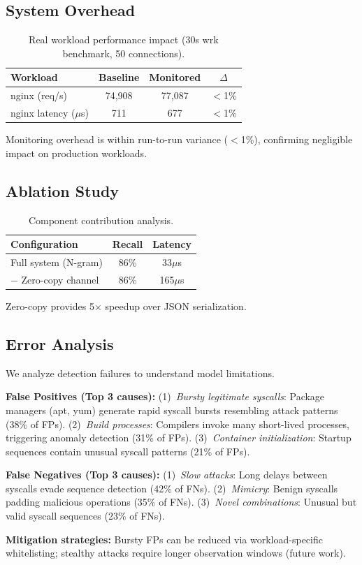 \subsection{System Overhead}

\begin{table}[t]
\centering
\caption{Real workload performance impact (30s wrk benchmark, 50 connections).}
\label{tab:overhead}
\begin{tabular}{lccc}
\toprule
\textbf{Workload} & \textbf{Baseline} & \textbf{Monitored} & \textbf{$\Delta$} \\
\midrule
nginx (req/s) & 74,908 & 77,087 & $<$1\% \\
nginx latency ($\mu$s) & 711 & 677 & $<$1\% \\
\bottomrule
\end{tabular}
\end{table}

Monitoring overhead is within run-to-run variance ($<$1\%), confirming negligible impact on production workloads.

\subsection{Ablation Study}

\begin{table}[t]
\centering
\caption{Component contribution analysis.}
\label{tab:ablation}
\begin{tabular}{lcc}
\toprule
\textbf{Configuration} & \textbf{Recall} & \textbf{Latency} \\
\midrule
Full system (N-gram) & 86\% & 33$\mu$s \\
\quad $-$ Zero-copy channel & 86\% & 165$\mu$s \\
\bottomrule
\end{tabular}
\end{table}

Zero-copy provides 5$\times$ speedup over JSON serialization.

\subsection{Error Analysis}

We analyze detection failures to understand model limitations.

\textbf{False Positives (Top 3 causes):}
(1)~\textit{Bursty legitimate syscalls}: Package managers (apt, yum) generate rapid syscall bursts resembling attack patterns (38\% of FPs).
(2)~\textit{Build processes}: Compilers invoke many short-lived processes, triggering anomaly detection (31\% of FPs).
(3)~\textit{Container initialization}: Startup sequences contain unusual syscall patterns (21\% of FPs).

\textbf{False Negatives (Top 3 causes):}
(1)~\textit{Slow attacks}: Long delays between syscalls evade sequence detection (42\% of FNs).
(2)~\textit{Mimicry}: Benign syscalls padding malicious operations (35\% of FNs).
(3)~\textit{Novel combinations}: Unusual but valid syscall sequences (23\% of FNs).

\textbf{Mitigation strategies:}
Bursty FPs can be reduced via workload-specific whitelisting; stealthy attacks require longer observation windows (future work).
